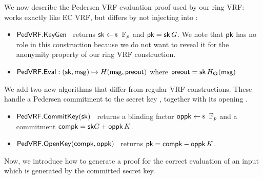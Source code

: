 We now describe the Pedersen VRF \PedVRF evaluation proof used by our ring VRF:
%
\KeyGen works exactly like EC VRF, but
 \Eval differs by not injecting \pk into \msg:
\begin{itemize}
\item ${\mathsf{PedVRF}}.{\mathsf{KeyGen}}$ \, returns $\sk \leftsample \F_p$ and $\mathsf{pk} = \mathsf{sk} \, G$.
We note that $ \mathsf{pk} $ has no role in this construction because we do not want to reveal it for the anonymity property of our ring VRF construction. %
\item ${\mathsf{PedVRF}}.{\mathsf{Eval}} : (\mathsf{sk},\mathsf{msg}) \mapsto H(\mathsf{msg}, {\mathsf{preout}})$ where $ {\mathsf{preout}} =  \mathsf{sk} \, H_{{\mathbf{G}}}(\mathsf{msg})$
\end{itemize}

\noindent We add two new algorithms that differ from regular VRF constructions.
These handle a Pedersen commitment to the secret key \sk,
 together with its opening \openpk.
\begin{itemize}
\item ${\mathsf{PedVRF}}.{\mathsf{CommitKey}}(\mathsf{sk})$ \, %
returns a blinding factor $\openpk \leftsample \F_p$
and a commitment $\mathsf{compk} = \mathsf{sk} G + \mathsf{oppk} \, K$.
\item ${\mathsf{PedVRF}}.{\mathsf{OpenKey}}(\mathsf{compk},\mathsf{oppk})$ \,
returns $\mathsf{pk} = \mathsf{compk} - \mathsf{oppk} \, K$.
\end{itemize}

Now, we introduce how to generate a proof for the correct evaluation of an input which is generated by the committed secret key. 


